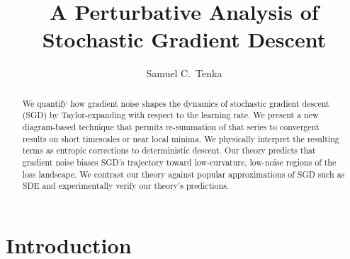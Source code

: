 



    \title{A Perturbative Analysis of Stochastic Gradient Descent}
    \author {
        Samuel C.\ Tenka \\
    }
    \maketitle
    
    \begin{abstract}
        We quantify how gradient noise shapes the dynamics of stochastic
        gradient descent (SGD) by Taylor-expanding with respect to the learning
        rate.  We present a new diagram-based technique that permits
        re-summation of that series to convergent results on short timescales
        or near local minima.  We physically interpret the resulting terms as
        entropic corrections to deterministic descent.  Our theory predicts that
        gradient noise biases SGD's trajectory toward low-curvature, low-noise
        regions of the loss landscape.  We contrast our theory against popular
        approximations of SGD such as SDE
        and experimentally verify our theory's predictions.

    \end{abstract}
    

    \section{Introduction}\label{sect:intro}
        
           
